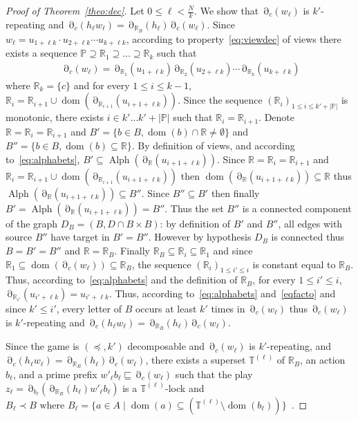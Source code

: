 \documentclass[a4paper,UKenglish]{lipics-v2016}
\newcommand{\PP}{\mathbb{P}}
\newcommand{\TT}{\mathbb{T}}
\newcommand{\RR}{\mathbb{R}}
\newcommand{\pref}{\sqsubseteq}
\DeclareMathOperator{\dom}{dom}
\DeclareMathOperator{\view}{\partial}
\DeclareMathOperator{\alphabet}{Alph}
\begin{document}
\begin{proof}[Proof of Theorem~\ref{theo:dec}]
Let 
$0 \leq \ell < \frac{N}{k}$.
We show that $\view_c(w_\ell)$ is $k'$-repeating
and $\view_c(h_\ell w_\ell)=\view_{\RR_B}(h_\ell)\view_c(w_\ell)$.
Since
$
w_\ell = u_{1 + \ell k } \cdot u_{2+\ell k} \cdots u_{k + \ell k}
$,
according to property~\eqref{eq:viewdec}
of views
there exists a sequence 
$\PP\supseteq  \RR_1\supseteq \ldots \supseteq \RR_k$ such that
\begin{align}
\label{eqfacto}
&\view_c(w_\ell)=
\view_{\RR_1}(u_{1 + \ell k })
\view_{\RR_2}(u_{2+\ell k})
\cdots
\view_{\RR_k}(u_{k+\ell k})\enspace
\end{align}
where $\RR_k=\{c\}$ and for every $1\leq i \leq k-1$,
$\RR_i=\RR_{i+1} \cup \dom(
\view_{\RR_{i+1}}(u_{i+1+\ell k})
)$.
Since the sequence
$(\RR_i)_{1 \leq i \leq k'+|\PP|}$ is monotonic,
there exists $i\in k'\dots k'+|\PP|$
such that $\RR_i=\RR_{i+1}$.
Denote $\RR=\RR_i=\RR_{i+1}$
and $B'=\{b \in B, \dom(b) \cap \RR\neq \emptyset\}$
and
$B''=\{b \in B, \dom(b) \subseteq \RR\}$.
By definition of views,
and according to~\eqref{eq:alphabets},
$B'\subseteq \alphabet(\view_{\RR}(u_{i+1+\ell k}))$. Since $\RR=\RR_i=\RR_{i+1}$ and $\RR_i=\RR_{i+1} \cup \dom(
\view_{\RR_{i+1}}(u_{i+1+\ell k})
)$ then
$\dom(
\view_{\RR}(u_{i+1+\ell k})
)\subseteq \RR$
thus $\alphabet(\view_{\RR}(u_{i+1+\ell k}))\subseteq B''$. Since $B'' \subseteq B'$ then finally $B'= \alphabet(\view_{\RR}(u_{i+1+\ell k}))=B''$.
Thus the set $B''$ is a connected component of the graph $D_B=(B,D\cap B \times B)$:
by definition of $B'$ and $B''$, all edges with source $B''$ have target in $B'=B''$.
However by hypothesis $D_B$ is connected thus $B=B'=B''$
and $\RR=\RR_B$.
Finally $\RR_B\subseteq \RR_i\subseteq \RR_1$ and since $\RR_1\subseteq \dom(\view_c(w_\ell))\subseteq \RR_B$,
the sequence $(\RR_i)_{1 \leq i' \leq i}$ is constant equal to $\RR_B$.
Thus, according to~\eqref{eq:alphabets} and the definition of $\RR_B$,
for every $1\leq i' \leq i$,
$\view_{\RR_{i'}}(u_{i'+\ell k})=u_{i'+\ell k}$.
Thus, according to~\eqref{eq:alphabets} and~\eqref{eqfacto}
and since $k' \leq i'$,
every letter of $B$ occurs at least $k'$ times in $\view_c(w_\ell)$
thus
$\view_c(w_\ell)$ is $k'$-repeating and $\view_c(h_\ell w_\ell)=\view_{\RR_B}(h_\ell)\view_c(w_\ell)$.

Since the game is $(\preceq,k')$
decomposable
and $\view_c(w_\ell)$ is $k'$-repeating,
and
$\view_c(h_\ell w_\ell)=\view_{\RR_B}(h_\ell)\view_c(w_\ell)$,
there exists
a superset $\TT^{(\ell)}$ of ${\RR_B}$,
an action $b_\ell$,
and a prime prefix $w'_\ell b_\ell\pref \view_c(w_\ell)$
such that
the play
$z_\ell=\view_{b_\ell}(\view_{\RR_B}(h_\ell) w'_\ell b_\ell)$
is a $\TT^{(\ell)}$-lock
and
\newcommand{\Tl}{\TT^{(\ell)}}
$
B_\ell \prec B \text{ where }
B_\ell =
\{ a \in A \mid \dom(a) \subseteq(\TT^{(\ell)} \setminus \dom(b_\ell)) \}\enspace.
$


\end{proof}
\end{document}
